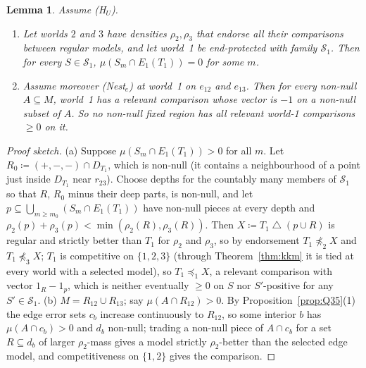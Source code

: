 \documentclass[11pt]{article}
\newtheorem{lemma}[theorem]{Lemma}
\theoremstyle{definition}
\theoremstyle{remark}
\newcommand{\sd}{\mathbin{\triangle}}
\begin{document}
\begin{lemma}\label{lem:E13}
Assume (H$_U$).
\begin{enumerate}[leftmargin=*,label=(\alph*)]
\item Let worlds $2$ and $3$ have densities $\rho_2,\rho_3$ that endorse all their comparisons between regular models, and let world~1 be end-protected with family $\mathcal S_1$. Then for every $S\in\mathcal S_1$, $\mu(S_m\cap E_1(T_1))=0$ for some $m$.
\item Assume moreover (Nest$_e$) at world~1 on $e_{12}$ and $e_{13}$. Then for every non-null $A\subseteq M$, world~1 has a relevant comparison whose vector is $-1$ on a non-null subset of $A$. So no non-null fixed region has all relevant world-1 comparisons $\ge0$ on it.
\end{enumerate}
\end{lemma}
\begin{proof}[Proof sketch]
(a) Suppose $\mu(S_m\cap E_1(T_1))>0$ for all $m$. Let $R_0\coloneqq(+,-,-)\cap D_{T_1}$, which is non-null (it contains a neighbourhood of a point just inside $D_{T_1}$ near $r_{23}$). Choose depths for the countably many members of $\mathcal S_1$ so that $R$, $R_0$ minus their deep parts, is non-null, and let $p\subseteq\bigcup_{m\ge m_0}(S_m\cap E_1(T_1))$ have non-null pieces at every depth and $\rho_2(p)+\rho_3(p)<\min(\rho_2(R),\rho_3(R))$. Then $X\coloneqq T_1\sd(p\cup R)$ is regular and strictly better than $T_1$ for $\rho_2$ and $\rho_3$, so by endorsement $T_1\not\preceq_2X$ and $T_1\not\preceq_3X$; $T_1$ is competitive on $\{1,2,3\}$ (through Theorem~\ref{thm:kkm} it is tied at every world with a selected model), so $T_1\preceq_1X$, a relevant comparison with vector $1_R-1_p$, which is neither eventually $\ge0$ on $S$ nor $S'$-positive for any $S'\in\mathcal S_1$. (b) $M=R_{12}\cup R_{13}$; say $\mu(A\cap R_{12})>0$. By Proposition~\ref{prop:Q35}(1) the edge error sets $c_b$ increase continuously to $R_{12}$, so some interior $b$ has $\mu(A\cap c_b)>0$ and $d_b$ non-null; trading a non-null piece of $A\cap c_b$ for a set $R\subseteq d_b$ of larger $\rho_2$-mass gives a model strictly $\rho_2$-better than the selected edge model, and competitiveness on $\{1,2\}$ gives the comparison.
\end{proof}
\end{document}

